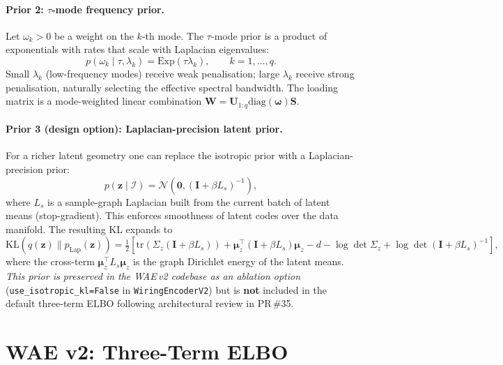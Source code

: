 \documentclass[11pt,a4paper]{article}
\newcommand{\KL}{\mathrm{KL}}
\newcommand{\N}{\mathcal{N}}
\newcommand{\I}{\mathcal{I}}
\newcommand{\diag}{\mathrm{diag}}
\newcommand{\tr}{\mathrm{tr}}
\newcommand{\bU}{\bm{U}}
\newcommand{\bS}{\bm{S}}
\newcommand{\bW}{\bm{W}}
\newcommand{\bz}{\bm{z}}
\newcommand{\bmu}{\bm{\mu}}
\newcommand{\bomega}{\bm{\omega}}
\begin{document}
\paragraph{Prior 2: $\tau$-mode frequency prior.}
Let $\omega_k > 0$ be a weight on the $k$-th mode.  The $\tau$-mode prior is a
product of exponentials with rates that scale with Laplacian eigenvalues:
\begin{equation}
  p(\omega_k\mid\tau,\lambda_k) = \mathrm{Exp}(\tau\lambda_k),
  \qquad k=1,\dots,q.
  \label{eq:prior_omega}
\end{equation}
Small $\lambda_k$ (low-frequency modes) receive weak penalisation; large
$\lambda_k$ receive strong penalisation, naturally selecting the effective
spectral bandwidth.  The loading matrix is a mode-weighted linear combination
$\bW = \bU_{1:q}\diag(\bomega)\bS$.

\paragraph{Prior 3 (design option): Laplacian-precision latent prior.}
For a richer latent geometry one can replace the isotropic prior with a
Laplacian-precision prior:
\begin{equation}
  p(\bz\mid\I) = \N(\mathbf{0}, (\bm{I}+\beta L_s)^{-1}),
  \label{eq:prior_z_lap}
\end{equation}
where $L_s$ is a sample-graph Laplacian built from the current batch of latent
means (stop-gradient).  This enforces smoothness of latent codes over the
data manifold.  The resulting KL expands to
\begin{equation}
  \KL(q(\bz)\|p_{\mathrm{Lap}}(\bz)) = \tfrac{1}{2}\!
  \left[
    \tr(\Sigma_z(\bm{I}{+}\beta L_s))
    + \bmu_z^\top(\bm{I}{+}\beta L_s)\bmu_z
    - d
    - \log\det\Sigma_z
    + \log\det(\bm{I}{+}\beta L_s)^{-1}
  \right],
  \label{eq:kl_lap}
\end{equation}
where the cross-term $\bmu_z^\top L_s\bmu_z$ is the graph Dirichlet energy of
the latent means.  \emph{This prior is preserved in the WAE\,v2 codebase as an
ablation option} (\texttt{use\_isotropic\_kl=False} in
\texttt{WiringEncoderV2}) but is \textbf{not} included in the default
three-term ELBO following architectural review in PR\,\#35.

\section{WAE v2: Three-Term ELBO}
\label{sec:elbo}
\end{document}
